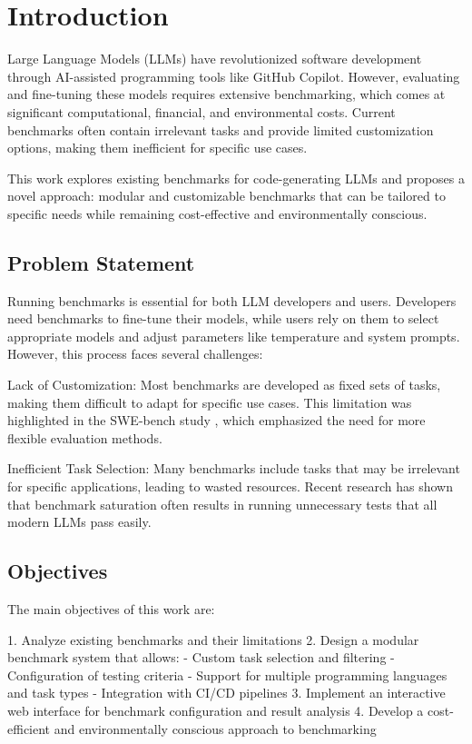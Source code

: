 \chapter{Introduction}

Large Language Models (LLMs) have revolutionized software development through AI-assisted programming tools like GitHub Copilot. However, evaluating and fine-tuning these models requires extensive benchmarking, which comes at significant computational, financial, and environmental costs. Current benchmarks often contain irrelevant tasks and provide limited customization options, making them inefficient for specific use cases.

This work explores existing benchmarks for code-generating LLMs and proposes a novel approach: modular and customizable benchmarks that can be tailored to specific needs while remaining cost-effective and environmentally conscious.

\section{Problem Statement}

Running benchmarks is essential for both LLM developers and users. Developers need benchmarks to fine-tune their models, while users rely on them to select appropriate models and adjust parameters like temperature and system prompts. However, this process faces several challenges:

Lack of Customization: Most benchmarks are developed as fixed sets of tasks, making them difficult to adapt for specific use cases. This limitation was highlighted in the SWE-bench study \cite{jimenez2024swebenchlanguagemodelsresolve}, which emphasized the need for more flexible evaluation methods.

Inefficient Task Selection: Many benchmarks include tasks that may be irrelevant for specific applications, leading to wasted resources. Recent research \cite{vendrow2025largelanguagemodelbenchmarks} has shown that benchmark saturation often results in running unnecessary tests that all modern LLMs pass easily.

\section{Objectives}

The main objectives of this work are:

1. Analyze existing benchmarks and their limitations
2. Design a modular benchmark system that allows:
   - Custom task selection and filtering
   - Configuration of testing criteria
   - Support for multiple programming languages and task types
   - Integration with CI/CD pipelines
3. Implement an interactive web interface for benchmark configuration and result analysis
4. Develop a cost-efficient and environmentally conscious approach to benchmarking

